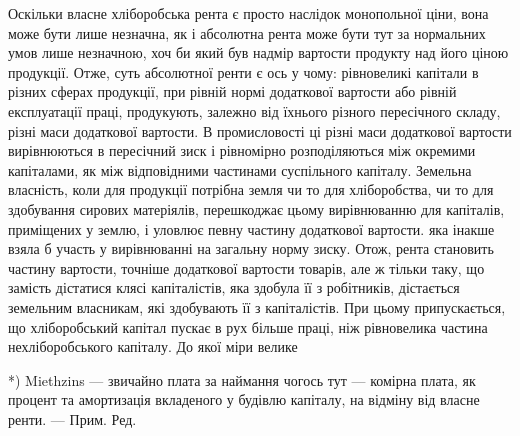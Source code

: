 Оскільки власне хліборобська рента є просто наслідок монопольної ціни,
вона може бути лише незначна, як і абсолютна рента може бути тут за нормальних
умов лише незначною, хоч би який був надмір вартости продукту
над його ціною продукції. Отже, суть абсолютної ренти є ось у чому: рівновеликі
капітали в різних сферах продукції, при рівній нормі додаткової вартости
або рівній експлуатації праці, продукують, залежно від їхнього різного пересічного
складу, різні маси додаткової вартости. В промисловості ці різні маси
додаткової вартости вирівнюються в пересічний зиск і рівномірно розподіляються
між окремими капіталами, як між відповідними частинами суспільного капіталу.
Земельна власність, коли для продукції потрібна земля чи то для хліборобства,
чи то для здобування сирових матеріялів, перешкоджає цьому вирівнюванню для
капіталів, приміщених у землю, і уловлює певну частину додаткової вартости.
яка інакше взяла б участь у вирівнюванні на загальну норму зиску. Отож,
рента становить частину вартости, точніше додаткової вартости товарів, але ж
тільки таку, що замість дістатися клясі капіталістів, яка здобула її з робітників,
дістається земельним власникам, які здобувають її з капіталістів. При
цьому припускається, що хліборобський капітал пускає в рух більше праці,
ніж рівновелика частина нехліборобського капіталу. До якої міри велике

*) Miethzins — звичайно плата за наймання чогось тут — комірна плата, як процент та амортизація
вкладеного у будівлю капіталу, на відміну від власне ренти. — Прим. Ред.
